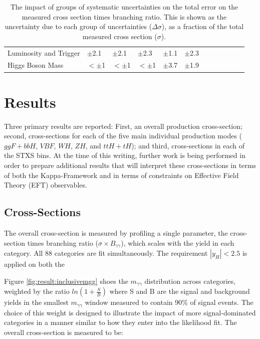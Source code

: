 \begin{table}[!htp]
\begin{center}
{\begin{tabular}{llllllllllll}
\hspace{3mm}Luminosity and Trigger   &  $\pm$2.1 & $\pm$2.1 & $\pm$2.3 & $\pm$1.1 & $\pm$2.3 \\
\hspace{3mm}Higgs Boson Mass &  $<\pm$1 & $<\pm$1 & $<\pm$1 & $\pm$3.7 & $\pm$1.9 \\
\hline
\hline
\end{tabular}
}
  \caption{The impact of groups of systematic uncertainties on the total error on the measured cross section times branching ratio. This is shown as the uncertainty due to each group of uncertainties ($\Delta \sigma$), as a fraction of the total measured cross section ($\sigma$).}
\label{tab:result:systematic}
\end{center}
\end{table}

\section{Results} \label{sec:Results}

Three primary results are reported: First, an overall production cross-section; second, cross-sections for each of the five main individual production modes ($ggF+bbH$, $VBF$, $WH$, $ZH$, and $ttH+tH$); and third, cross-sections in each of the STXS bins. At the time of this writing, further work is being performed in order to prepare additional results that will interpret these cross-sections in terms of both the Kappa-Framework and in terms of constraints on Effective Field Theory (EFT) observables.

\subsection{Cross-Sections} \label{sec:Xsecs}

The overall cross-section is measured by profiling a single parameter, the cross-section times branching ratio ($\sigma \times B_{\gamma \gamma}$), which scales with the yield in each category. All 88 categories are fit simultaneously. The requirement $|y_{H}|<2.5$ is applied on both the 

Figure \ref{fig:result:inclusivemgg} shoes the $m_{\gamma\gamma}$ distribution across categories, weighted by the ratio $ln(1+\frac{S}{B})$ where S and B are the signal and background yields in the smallest $m_{\gamma\gamma}$ window measured to contain 90\% of signal events. The choice of this weight is designed to illustrate the impact of more signal-dominated categories in a manner similar to how they enter into the likelihood fit. 
The overall cross-section is measured to be:

